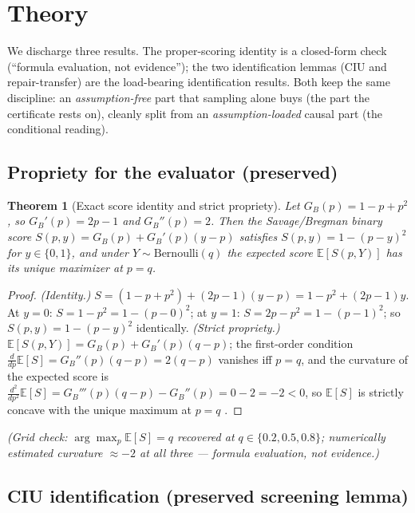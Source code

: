 \documentclass[11pt]{article}
\theoremstyle{plain}
\newtheorem{theorem}{Theorem}
\theoremstyle{definition}
\newcommand{\Eop}{\mathbb{E}}
\begin{document}
\section{Theory}\label{sec:theory}

We discharge three results. The proper-scoring identity is a closed-form check
(``formula evaluation, not evidence''); the two identification lemmas (CIU and
repair-transfer) are the load-bearing identification results. Both keep the same
discipline: an \emph{assumption-free} part that sampling alone buys (the part the
certificate rests on), cleanly split from an \emph{assumption-loaded} causal part
(the conditional reading).

\subsection{Propriety for the evaluator (preserved)}

\begin{theorem}[Exact score identity and strict propriety]\label{thm:propriety}
Let $G_B(p)=1-p+p^2$, so $G_B'(p)=2p-1$ and $G_B''(p)=2$. Then the Savage/Bregman
binary score $S(p,y)=G_B(p)+G_B'(p)(y-p)$ satisfies $S(p,y)=1-(p-y)^2$ for
$y\in\{0,1\}$, and under $Y\sim\mathrm{Bernoulli}(q)$ the expected score
$\Eop[S(p,Y)]$ has its unique maximizer at $p=q$.
\end{theorem}
\begin{proof}
\emph{(Identity.)} $S=(1-p+p^2)+(2p-1)(y-p)=1-p^2+(2p-1)y$. At $y=0$:
$S=1-p^2=1-(p-0)^2$; at $y=1$: $S=2p-p^2=1-(p-1)^2$; so $S(p,y)=1-(p-y)^2$
identically. \emph{(Strict propriety.)} $\Eop[S(p,Y)]=G_B(p)+G_B'(p)(q-p)$;
the first-order condition $\frac{d}{dp}\Eop[S]=G_B''(p)(q-p)=2(q-p)$ vanishes iff
$p=q$, and the curvature of the expected score is
$\frac{d^2}{dp^2}\Eop[S]=G_B'''(p)(q-p)-G_B''(p)=0-2=-2<0$, so $\Eop[S]$ is
strictly concave with the unique maximum at $p=q$
\cite{savage1971elicitation,gneiting2007strictly}.
\end{proof}
\noindent\emph{(Grid check: $\arg\max_p\Eop[S]=q$ recovered at $q\in\{0.2,0.5,0.8\}$;
numerically estimated curvature $\approx-2$ at all three --- formula evaluation,
not evidence.)}

\subsection{CIU identification (preserved screening lemma)}\label{sec:theory:ciu}
\end{document}
